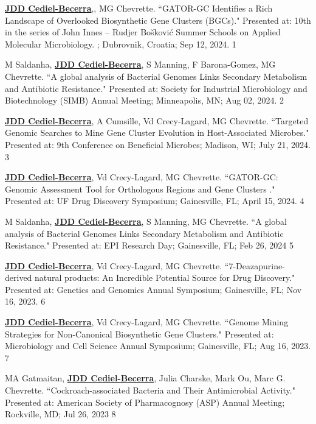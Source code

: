 \begin{cvpubs}

\cvpub
{\textbf{\underline{JDD Cediel-Becerra}},, MG Chevrette. ``GATOR-GC Identifies a Rich Landscape of Overlooked Biosynthetic Gene Clusters (BGCs)." Presented at: 10th in the series of John Innes – Rudjer Bošković Summer Schools on Applied Molecular Microbiology. ; Dubrovnik, Croatia; Sep 12, 2024.}
{1}

\cvpub
{M Saldanha, \textbf{\underline{JDD Cediel-Becerra}}, S Manning, F Barona-Gomez, MG Chevrette. ``A global analysis of Bacterial Genomes Links Secondary Metabolism and Antibiotic Resistance." Presented at: Society for Industrial Microbiology and Biotechnology (SIMB) Annual Meeting; Minneapolis, MN; Aug 02, 2024.}
{2}

\cvpub
{\textbf{\underline{JDD Cediel-Becerra}}, A Cumsille, Vd Crecy-Lagard, MG Chevrette. ``Targeted Genomic Searches to Mine Gene Cluster Evolution in Host-Associated Microbes." Presented at: 9th Conference on Beneficial Microbes; Madison, WI; July 21, 2024.}
{3}

\cvpub
{\textbf{\underline{JDD Cediel-Becerra}}, Vd Crecy-Lagard, MG Chevrette. ``GATOR-GC: Genomic Assessment Tool for Orthologous Regions and Gene Clusters ." Presented at: UF Drug Discovery Symposium; Gainesville, FL; April 15, 2024.}
{4}

\cvpub
{M Saldanha, \textbf{\underline{JDD Cediel-Becerra}}, S Manning, MG Chevrette. ``A global analysis of Bacterial Genomes Links Secondary Metabolism and Antibiotic Resistance." Presented at: EPI Research Day; Gainesville, FL; Feb 26, 2024}
{5}

\cvpub
{\textbf{\underline{JDD Cediel-Becerra}}, Vd Crecy-Lagard, MG Chevrette. ``7-Deazapurine-derived natural products: An Incredible Potential Source for Drug Discovery." Presented at: Genetics and Genomics Annual Symposium; Gainesville, FL; Nov 16, 2023.}
{6}

\cvpub
{\textbf{\underline{JDD Cediel-Becerra}}, Vd Crecy-Lagard, MG Chevrette. ``Genome Mining Strategies for Non-Canonical Biosynthetic Gene Clusters." Presented at: Microbiology and Cell Science Annual Symposium; Gainesville, FL; Aug 16, 2023.}
{7}

\cvpub
{MA Gatmaitan, \textbf{\underline{JDD Cediel-Becerra}}, Julia Charske, Mark Ou, Marc G. Chevrette. ``Cockroach-associated Bacteria and Their Antimicrobial Activity." Presented at: American Society of Pharmacognosy (ASP) Annual Meeting; Rockville, MD; Jul 26, 2023}
{8}


\end{cvpubs}
